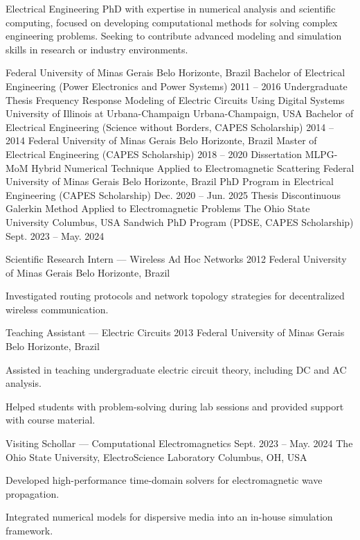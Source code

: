 \documentclass[11pt]{cv}
\begin{document}
\makeprofileheader

\begin{Objective}
    Electrical Engineering PhD with expertise in numerical analysis
    and scientific computing, focused on developing computational
    methods for solving complex engineering problems. Seeking to
    contribute advanced modeling and simulation skills in research or
    industry environments.
\end{Objective}

\begin{Education}
    \educationitem
    {Federal University of Minas Gerais}
    {Belo Horizonte, Brazil}
    {Bachelor of Electrical Engineering (Power Electronics and Power Systems)}
    {2011 -- 2016}
    {Undergraduate Thesis}
    {Frequency Response Modeling of Electric Circuits Using Digital Systems}
    \educationitem
    {University of Illinois at Urbana-Champaign}
    {Urbana-Champaign, USA}
    {Bachelor of Electrical Engineering (Science without Borders,
    CAPES Scholarship)}
    {2014 -- 2014}
    {}
    {}
    \educationitem
    {Federal University of Minas Gerais}
    {Belo Horizonte, Brazil}
    {Master of Electrical Engineering (CAPES Scholarship)}
    {2018 -- 2020}
    {Dissertation}
    {MLPG-MoM Hybrid Numerical Technique Applied to Electromagnetic Scattering}
    \educationitem
    {Federal University of Minas Gerais}
    {Belo Horizonte, Brazil}
    {PhD Program in Electrical Engineering (CAPES Scholarship)}
    {Dec. 2020 -- Jun. 2025}
    {Thesis}
    {Discontinuous Galerkin Method Applied to Electromagnetic Problems}
    \educationitem
    {The Ohio State University}
    {Columbus, USA}
    {Sandwich PhD Program (PDSE, CAPES Scholarship)}
    {Sept. 2023 -- May. 2024}
    {}
    {}
\end{Education}

\begin{Experience}
    \experienceitem
    {Scientific Research Intern — Wireless Ad Hoc Networks}
    {2012}
    {Federal University of Minas Gerais}
    {Belo Horizonte, Brazil}
    {
    \item Investigated routing protocols and network topology
        strategies for decentralized wireless communication.
    }
    \experienceitem
    {Teaching Assistant — Electric Circuits}
    {2013}
    {Federal University of Minas Gerais}
    {Belo Horizonte, Brazil}
    {
    \item Assisted in teaching undergraduate electric circuit theory,
        including DC and AC analysis.
    \item Helped students with problem-solving during lab sessions
        and provided support with course material.
    }
    \experienceitem
    {Visiting Schollar — Computational Electromagnetics}
    {Sept. 2023 -- May. 2024}
    {The Ohio State University, ElectroScience Laboratory}
    {Columbus, OH, USA}
    {
    \item Developed high-performance time-domain solvers for
        electromagnetic wave propagation.
    \item Integrated numerical models for dispersive media into an
        in-house simulation framework.
    }
\end{Experience}
\end{document}
